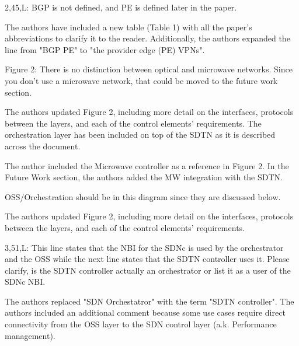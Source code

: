 \documentclass[12pt]{journalrebuttal}
\begin{document}
\begin{revcomment}
2,45,L: BGP is not defined, and PE is defined later in the paper.
\end{revcomment}

\begin{response}
The authors have included a new table (Table 1) with all the paper's abbreviations to clarify it to the reader.  Additionally, the authors expanded the line from "BGP PE" to "the provider edge (PE) VPNs".
\end{response}

\begin{revcomment}
Figure 2: There is no distinction between optical and microwave networks.  Since you don’t use a microwave network, that could be moved to the future work section.
\end{revcomment}

\begin{response}
The authors updated Figure 2, including more detail on the interfaces, protocols between the layers, and each of the control elements' requirements. The orchestration layer has been included on top of the SDTN as it is described across the document. 

The author included the Microwave controller as a reference in Figure 2. In the Future Work section, the authors added the  MW integration with the SDTN.
\end{response}

\begin{revcomment}
OSS/Orchestration should be in this diagram since they are discussed below.
\end{revcomment}

\begin{response}
The authors updated Figure 2, including more detail on the interfaces, protocols between the layers, and each of the control elements' requirements. 
\end{response}

\begin{revcomment}
3,51,L: This line states that the NBI for the SDNc is used by the orchestrator and the OSS while the next line states that the SDTN controller uses it.  Please clarify, is the SDTN controller actually an orchestrator or list it as a user of the SDNc NBI.
\end{revcomment}

\begin{response}
The authors replaced "SDN Orchestatror" with the term "SDTN controller". The authors included an additional comment because some use cases require direct connectivity from the OSS layer to the SDN control layer (a.k. Performance management).
\end{response}
\end{document}
